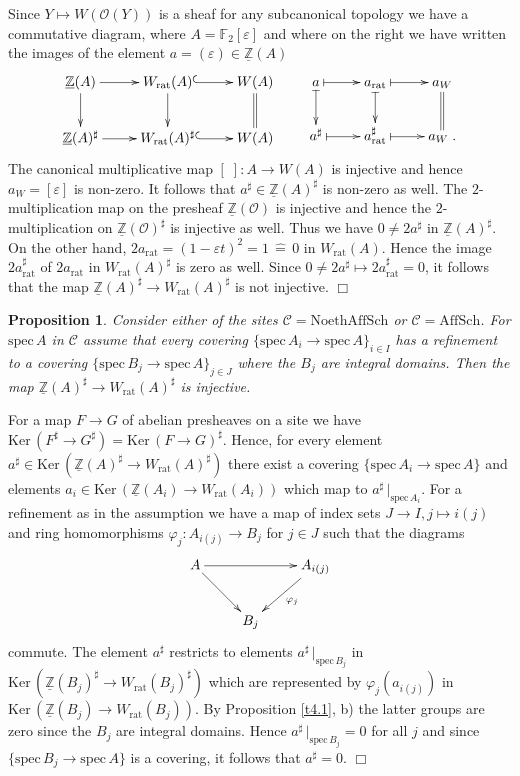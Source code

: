 \documentclass[12pt,leqno]{article}
\newcommand{\F}{{\mathbb{F}}}
\newcommand{\Z}{{\mathbb{Z}}}
\newcommand{\uZ}{\underline{\Z}}
\newcommand{\NAS}{\mathrm{NoethAffSch}}
\newcommand{\AS}{\mathrm{AffSch}}
\newcommand{\spec}{\mathrm{spec}\,}
\newcommand{\Ker}{\mathrm{Ker}\,}
\newcommand{\rat}{\mathrm{rat}}
\newcommand{\Ch}{{\mathcal C}}
\newcommand{\Oh}{{\mathcal O}}
\newcommand{\ent}{\,\hat{=}\,}
\newtheorem{prop}[theorem]{Proposition}
\newenvironment{proof}{\noindent {\bf Proof}}{\mbox{}\hspace*{\fill}$\Box$}
\begin{document}
\begin{proof}
Since $Y \mapsto W (\Oh (Y))$ is a sheaf for any subcanonical topology we have a commutative diagram, where $A = \F_2 [\varepsilon]$ and where on the right we have written the images of the element $a = (\varepsilon) \in \uZ (A)$
\[
\xymatrix{
\uZ (A) \ar[r] \ar[d] & W_{\rat} (A) \ar@{^{(}->}[r] \ar[d] & W (A) \ar@{=}[d] \\
\uZ (A)^{\sharp} \ar[r] & W_{\rat} (A)^{\sharp} \ar@{^{(}->}[r] & W (A)
} \qquad
\xymatrix{
a \ar@{|->}[r] \ar@{|->}[d] & a_{\rat} \ar@{|->}[r] \ar@{|->}[d] & a_W \ar@{=}[d] \\
a^{\sharp} \ar@{|->}[r] & a^{\sharp}_{\rat} \ar@{|->}[r] & a_W\; .
}
\]
The canonical multiplicative map $[\;] : A \to W (A)$ is injective and hence $a_W = [\varepsilon]$ is non-zero. It follows that $a^{\sharp} \in \uZ (A)^{\sharp}$ is non-zero as well. The $2$-multiplication map on the presheaf $\uZ (\Oh)$ is injective and hence the $2$-multiplication on $\uZ (\Oh)^{\sharp}$ is injective as well. Thus we have $0 \neq 2 a^{\sharp}$ in $\uZ (A)^{\sharp}$. On the other hand, $2a_{\rat} = (1 - \varepsilon t)^2 = 1 \ent 0$ in $W_{\rat} (A)$. Hence the image $2a^{\sharp}_{\rat}$ of $2a_{\rat}$ in $W_{\rat} (A)^{\sharp}$ is zero as well. Since $0 \neq 2a^{\sharp} \mapsto 2a^{\sharp}_{\rat} = 0$, it follows that the map $\uZ (A)^{\sharp} \to W_{\rat} (A)^{\sharp}$ is not injective.
\end{proof}

\begin{prop}
\label{t4.5}
Consider either of the sites $\Ch = \NAS$ or $\Ch = \AS$. For $\spec A$ in $\Ch$ assume that every covering $\{ \spec A_i \to \spec A \}_{i \in I}$ has a refinement to a covering $\{ \spec B_j \to \spec A \}_{j \in J}$ where the $B_j$ are integral domains. Then the map $\uZ (A)^{\sharp} \to W_{\rat} (A)^{\sharp}$ is injective.
\end{prop}

\begin{proof}
For a map $F \to G$ of abelian presheaves on a site we have $\Ker (F^{\sharp} \to G^{\sharp}) = \Ker (F \to G)^{\sharp}$. Hence, for every element $a^{\sharp} \in \Ker (\uZ (A)^{\sharp} \to W_{\rat} (A)^{\sharp})$ there exist a covering $\{ \spec A_i \to \spec A \}$ and elements $a_i \in \Ker (\uZ (A_i) \to W_{\rat} (A_i))$ which map to $a^{\sharp} \, |_{\spec A_i}$. For a refinement as in the assumption we have a map of index sets $J \to I , j \mapsto i (j)$ and ring homomorphisms $\varphi_j : A_{i (j)} \to B_j$ for $j \in J$ such that the diagrams
\[
\xymatrix{
A \ar[rr] \ar[dr] & & A_{i (j)} \ar[dl]^{\varphi_j} \\
 & B_j &
}
\]
commute. The element $a^{\sharp}$ restricts to elements $a^{\sharp} \, |_{\spec B_j}$ in $\Ker (\uZ (B_j)^{\sharp} \to W_{\rat} (B_j)^{\sharp})$ which are represented by $\varphi_j (a_{i (j)})$ in $\Ker (\uZ (B_j) \to W_{\rat} (B_j))$. By Proposition \ref{t4.1}, b) the latter groups are zero since the $B_j$ are integral domains. Hence $a^{\sharp} \, |_{\spec B_j} = 0$ for all $j$ and since $\{ \spec B_j \to \spec A \}$ is a covering, it follows that $a^{\sharp} = 0$.
\end{proof}
\end{document}
